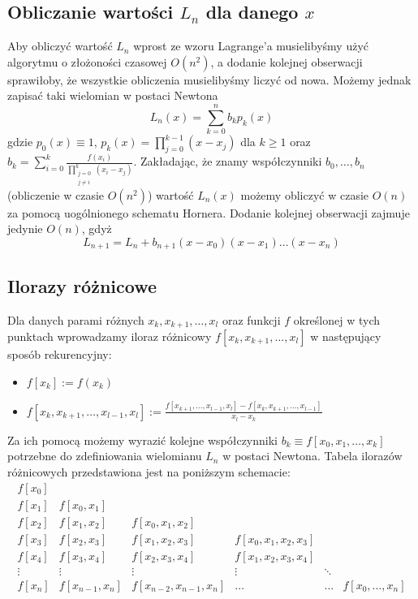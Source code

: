 \documentclass[a4paper,11pt]{article}
\begin{document}
\subsection{Obliczanie wartości $L_n$ dla danego $x$}
Aby obliczyć wartość $L_n$ wprost ze wzoru Lagrange'a musielibyśmy użyć algorytmu o złożoności czasowej $O(n^2)$, a dodanie kolejnej obserwacji sprawiłoby, że wszystkie obliczenia musielibyśmy liczyć od nowa. Możemy jednak zapisać taki wielomian w postaci Newtona
$$ L_n(x)=\sum\limits_{k=0}^{n}b_kp_k(x) $$
gdzie $p_0(x)\equiv1$, $p_k(x)=\prod\limits_{j=0}^{k-1}(x-x_j)$ dla $k\geq1$ oraz $b_k=\sum\limits_{i=0}^{k} \frac{f(x_i)}{\prod\limits_{\substack{j=0\\j\neq i}}^{k}(x_i-x_j)}$.
\newline Zakładając, że znamy współczynniki $b_0,\ldots,b_n$ (obliczenie w czasie $O(n^2)$) wartość $L_n(x)$ możemy obliczyć w czasie $O(n)$ za pomocą uogólnionego schematu Hornera. Dodanie kolejnej obserwacji zajmuje jedynie $O(n)$, gdyż
$$L_{n+1}=L_n+b_{n+1}(x-x_0)(x-x_1)\ldots(x-x_n)$$

\subsection{Ilorazy różnicowe}
Dla danych parami różnych $x_k, x_{k+1}, \ldots, x_l$ oraz funkcji $f$ określonej w tych punktach wprowadzamy iloraz różnicowy $f[x_k, x_{k+1}, \ldots, x_l]$ w następujący sposób rekurencyjny:
\begin{itemize}
\item $f[x_k] := f(x_k)$
\item $f[x_k, x_{k+1}, \ldots, x_{l-1}, x_l] := \frac{f[x_{k+1}, \ldots, x_{l-1}, x_l] - f[x_k, x_{k+1}, \ldots, x_{l-1}]}{x_l -x_k}$
\end{itemize}
\noindent Za ich pomocą możemy wyrazić kolejne współczynniki $b_k\equiv f[x_0, x_1, \ldots, x_k]$ potrzebne do zdefiniowania wielomianu $L_n$ w postaci Newtona. Tabela ilorazów różnicowych przedstawiona jest na poniższym schemacie:
$$
\begin{array}{ccccccc} %
f[x_0]		\\	
f[x_1]		&	f[x_0, x_1]		\\
f[x_2]		&	f[x_1, x_2]		&	f[x_0, x_1, x_2]	\\	
f[x_3]		&	f[x_2, x_3]		&	f[x_1, x_2, x_3]		&	f[x_0, x_1, x_2, x_3]	\\
f[x_4]		&	f[x_3, x_4]		&	f[x_2, x_3, x_4]		&	f[x_1, x_2, x_3, x_4]	\\
\vdots 	&	\vdots 		&	\vdots 			&	\vdots 			&	\ddots 	\\
f[x_n]		&	f[x_{n-1}, x_n]	&	f[x_{n-2}, x_{n-1}, x_n]	&	\ldots 				&	\ldots 		& 	f[x_0, \ldots, x_n]
\end{array}
$$
\end{document}
